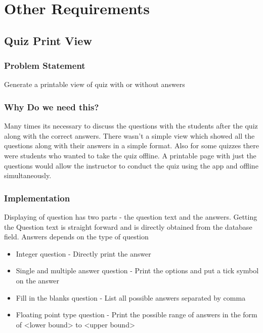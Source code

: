 \clearpage
\section{Other Requirements} 
\hspace{0.5cm} 

\subsection{Quiz Print View}
\subsubsection{Problem Statement}
	Generate a printable view of quiz with or without answers

\subsubsection{Why Do we need this?}
	Many times its necessary to discuss the questions with the students after the quiz along with the correct answers. There wasn't a simple view which showed all the questions along with their answers in a simple format. Also for some quizzes there were students who wanted to take the quiz offline. A printable page with just the questions would allow the instructor to conduct the quiz using the app and offline simultaneously.

\subsubsection{Implementation}
	Displaying of question has two parts - the question text and the answers. Getting the Question text is straight forward and is directly obtained from the database field. Answers depends on the type of question

    \begin{itemize}
        \item Integer question - Directly print the answer
	    \item Single and multiple answer question - Print the options and put a tick symbol on the answer
	    \item Fill in the blanks question - List all possible answers separated by comma
	    \item Floating point type question - Print the possible range of answers in the form of <lower bound> to <upper bound>
	\end{itemize}

